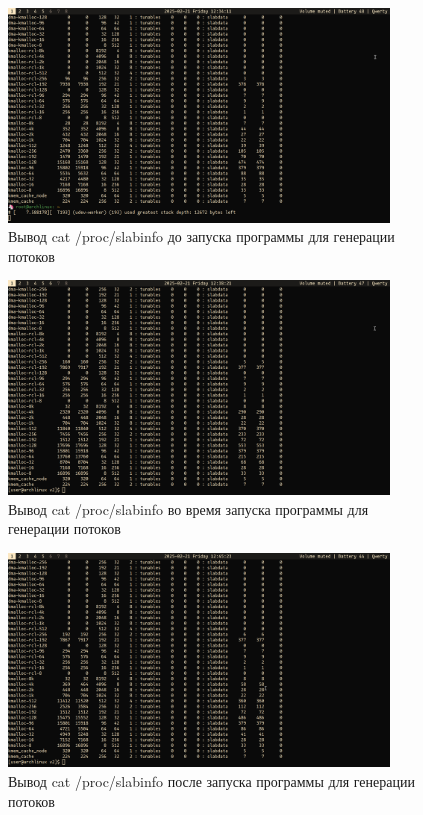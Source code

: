 \begin{figure}[H]
	\centering
	\includegraphics[width=0.9\textwidth]{img/slab-before.png}
	\caption{Вывод cat /proc/slabinfo до запуска программы для генерации потоков}
	\label{fig:slab-before}
\end{figure}

\begin{figure}[H]
	\centering
	\includegraphics[width=0.9\textwidth]{img/slab-while.png}
	\caption{Вывод cat /proc/slabinfo во время запуска программы для генерации потоков}
	\label{fig:slab-while}
\end{figure}

\begin{figure}[H]
	\centering
	\includegraphics[width=0.9\textwidth]{img/slab-after.png}
	\caption{Вывод cat /proc/slabinfo после запуска программы для генерации потоков}
	\label{fig:slab-after}
\end{figure}

